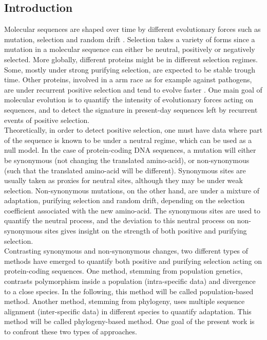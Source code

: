 \documentclass[10pt]{article}
\begin{document}
	\begin{multicols}{2}
	\section*{Introduction}

	Molecular sequences are shaped over time by different evolutionary forces such as mutation, selection and random drift \cite{ohta_nearly_1992}. Selection takes a variety of forms since a mutation in a molecular sequence can either be neutral, positively or negatively selected. More globally, different proteins might be in different selection regimes. Some, mostly under strong purifying selection, are expected to be stable trough time.
	Other proteins, involved in a arm race as for example against pathogens, are under recurrent positive selection and tend to evolve faster \cite{enard_viruses_2016}. One main goal of molecular evolution is to quantify the intensity of evolutionary forces acting on sequences, and to detect the signature in present-day sequences left by recurrent events of positive selection. \\
	
	Theoretically, in order to detect positive selection, one must have data where part of the sequence is known to be under a neutral regime, which can be used as a null model. In the case of protein-coding DNA sequences, a mutation will either be synonymous (not changing the translated amino-acid), or non-synonymous (such that the translated amino-acid will be different). Synonymous sites are usually taken as proxies for neutral sites, although they may be under weak selection. Non-synonymous mutations, on the other hand, are under a mixture of adaptation, purifying selection and random drift, depending on the selection coefficient associated with the new amino-acid. The synonymous sites are used to quantify the neutral process, and the deviation to this neutral process on non-synonymous sites gives insight on the strength of both positive and purifying selection. \\
	
	Contrasting synonymous and non-synonymous changes, two different types of methods have emerged to quantify both positive and purifying selection acting on protein-coding sequences.
	One method, stemming from population genetics, contrasts polymorphism inside a population (intra-specific data) and divergence to a close species. In the following, this method will be called population-based method. Another method, stemming from phylogeny, uses multiple sequence alignment (inter-specific data) in different species to quantify adaptation. This method will be called phylogeny-based method. One goal of the present work is to confront these two types of approaches.\\
	

\end{multicols}
\end{document}
